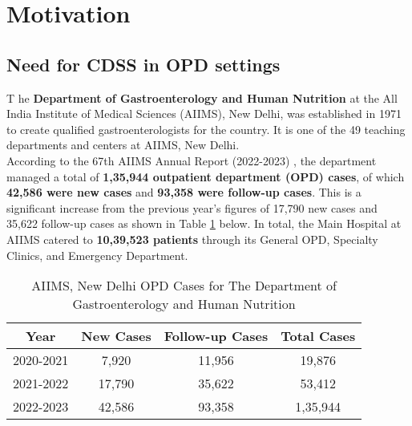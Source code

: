 
\section{Motivation}
\subsection{Need for CDSS in OPD settings}
\lettrine{T}{ }he \textcolor{TUMRed}{\textbf{Department of Gastroenterology and Human Nutrition}} at the All India Institute of Medical Sciences (AIIMS), New Delhi, was established in 1971 to create qualified gastroenterologists for the country. It is one of the 49 teaching departments and centers at AIIMS, New Delhi.\\[\baselineskip]

\noindent According to the 67th AIIMS Annual Report (2022-2023) \cite{AIIMS2024}, the department managed a total of \textcolor{TUMRed}{\textbf{1,35,944 outpatient department (OPD) cases}}, of which \textcolor{TUMRed}{\textbf{42,586 were new cases}} and \textcolor{TUMRed}{\textbf{93,358 were follow-up cases}}. This is a significant increase from the previous year's figures of 17,790 new cases and 35,622 follow-up cases as shown in Table \ref{tab:aiims_opd} below. In total, the Main Hospital at AIIMS catered to \textcolor{TUMRed}{\textbf{10,39,523 patients}} through its General OPD, Specialty Clinics, and Emergency Department.

\begin{table}[h]
    \centering
    \begin{tabular}{|c|c|c|c|}
        \hline
        \textbf{Year} & \textbf{New Cases} & \textbf{Follow-up Cases} & \textbf{Total Cases} \\
        \hline
        2020-2021 & 7,920 & 11,956 & 19,876 \\
        2021-2022 & 17,790 & 35,622 & 53,412 \\
        2022-2023 & 42,586 & 93,358 & 1,35,944 \\
        \hline
    \end{tabular}
    \caption{AIIMS, New Delhi OPD Cases for The Department of Gastroenterology and Human Nutrition}
    \label{tab:aiims_opd}
\end{table}

